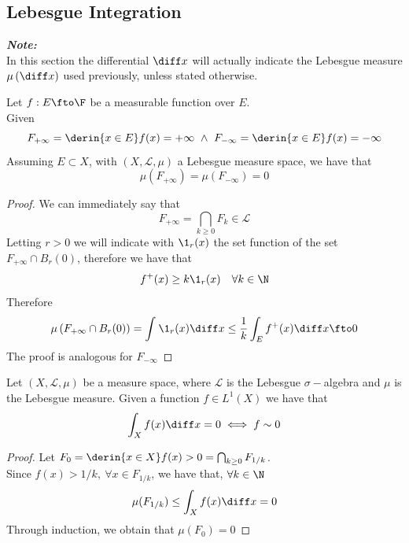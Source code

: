 \documentclass[../mmf.tex]{subfiles}
\begin{document}
\subsection{Lebesgue Integration}
\textit{\textbf{Note:}}\\
In this section the differential $\diff x$ will actually indicate the Lebesgue measure $\mu\left( \diff x \right)$ used previously, unless stated otherwise.
\begin{thm}
	Let $f:E\fto\F$ be a measurable function over $E$.\\
	Given
	\begin{equation*}
		F_{+\infty}={\derin{x\in E}f(x)=+\infty}\ \wedge\ F_{-\infty}={\derin{x\in E}f(x)=-\infty}
	\end{equation*}
	Assuming $E\subset X$, with $(X,\mathcal{L},\mu)$ a Lebesgue measure space, we have that
	\begin{equation*}
		\mu\left( F_{+\infty} \right)=\mu\left( F_{-\infty} \right)=0
	\end{equation*}
\end{thm}
\begin{proof}
	We can immediately say that
	\begin{equation*}
		F_{+\infty}=\bigcap_{k\ge0}F_k\in\mathcal{L}
	\end{equation*}
	Letting $r>0$ we will indicate with $\1_r(x)$ the set function of the set $F_{+\infty}\cap B_r(0)$, therefore we have that
	\begin{equation*}
		f^+(x)\ge k\1_r(x)\quad\forall k\in\N
	\end{equation*}
	Therefore
	\begin{equation*}
		\mu\left( F_{+\infty}\cap B_r(0) \right)=\int_{}^{}\1_r(x)\diff x\le\frac{1}{k}\int_{E}f^+(x)\diff x\fto0
	\end{equation*}
	The proof is analogous for $F_{-\infty}$
\end{proof}
\begin{thm}
	Let $(X,\mathcal{L},\mu)$ be a measure space, where $\mathcal{L}$ is the Lebesgue $\sigma-$algebra and $\mu$ is the Lebesgue measure. Given a function $f\in L^1(X)$ we have that
	\begin{equation}
		\int_{X}f(x)\diff x=0\iff{} f\sim 0
		\label{eq:nullintegral}
	\end{equation}
\end{thm}
\begin{proof}
	Let $F_0={\derin{x\in X}f(x)>0}=\bigcap_{k\ge0}F_{1/k}$.\\
	Since $f(x)>1/k,\ \forall x\in F_{1/k}$, we have that, $\forall k\in\N$
	\begin{equation*}
		\mu(F_{1/k})\le\int_{X}^{}f(x)\diff x=0
	\end{equation*}
	Through induction, we obtain that $\mu(F_0)=0$
\end{proof}
\end{document}
